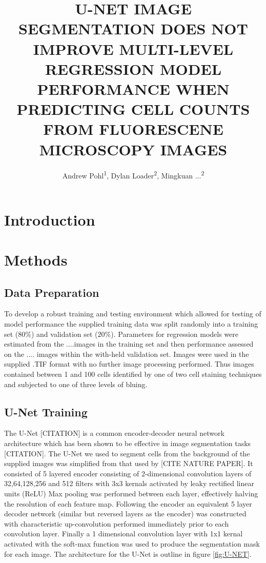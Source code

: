 \documentclass[isoft]{poster_class_UofC}
\title{\uppercase{U-Net image segmentation does not improve multi-level \\regression model performance when predicting cell counts \\from fluorescene microscopy images }}
\author{Andrew Pohl\textsuperscript{1}, Dylan Loader\textsuperscript{2}, Mingkuan ...\textsuperscript{2}}
\begin{document}
    \begin{poster}
    
    \section{Introduction}
    
        \lipsum[3-5]
        
    \section{Methods}%
        
        \subsection{Data Preparation}
       To develop a robust training and testing environment which allowed for testing of model performance the supplied training data was split randomly into a training set ($80\%$) and validation set ($20\%$).  Parameters for regression models were estimated from the ....images in the training set and then performance assessed on the .... images within the with-held validation set.  Images were used in the supplied .TIF format with no further image processing performed. Thus images contained between 1 and 100 cells identified by one of two cell staining techniques and subjected to one of three levels of bluing.
        \subsection{U-Net Training}
The U-Net [CITATION] is a common encoder-decoder neural network architecture which has been shown to be effective in image segmentation tasks [CITATION]. The U-Net we used to segment cells from the background of the supplied images was simplified from that used by [CITE NATURE PAPER].  It consisted of 5 layered encoder consisting of 2-dimensional convolution layers of 32,64,128,256 and 512 filters with 3x3 kernals activated by leaky rectified linear units (ReLU) Max pooling was performed between each layer, effectively halving the resolution of each feature map.  Following the encoder an equivalent 5 layer decoder network (similar but reversed layers as the encoder) was constructed with characteristic up-convolution performed immediately prior to each convolution layer.  Finally a 1 dimensional convolution layer with 1x1 kernal activated with the soft-max function was used to produce the segmentation mask for each image. The architecture for the U-Net is outline in figure \ref{fig:U-NET}.
        

\end{poster}
\end{document}
